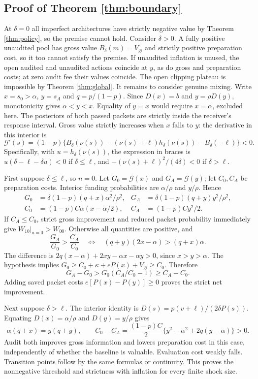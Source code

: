 \documentclass[11pt]{article}
\begin{document}
\subsection{Proof of Theorem \ref{thm:boundary}}\label{app:boundary}
At $\delta=0$ all imperfect architectures have strictly negative value by Theorem \ref{thm:policy}, so the premise cannot hold. Consider $\delta>0$. A fully positive unaudited pool has gross value $B_\delta(m)=V_\varnothing$ and strictly positive preparation cost, so it too cannot satisfy the premise. If unaudited inflation is unused, the open audited and unaudited actions coincide at $y$, as do gross and preparation costs; at zero audit fee their values coincide. The open clipping plateau is impossible by Theorem \ref{thm:global}. It remains to consider genuine mixing. Write $x=s_0>\alpha$, $y=s_A$ and $q=p/(1-p)$. Since $D(x)=b$ and $y=\rho D(y)$, monotonicity gives $\alpha<y<x$. Equality of $y=x$ would require $x=\alpha$, excluded here. The posteriors of both passed packets are strictly inside the receiver's response interval. Gross value strictly increases when $x$ falls to $y$: the derivative in this interior is
\[
\mathcal G'(s)=(1-p)\{B_\delta(\nu(s))-(\nu(s)+\ell)h_\delta(\nu(s))-B_\delta(-\ell)\}<0.
\]
Specifically, with $u=h_\delta(\nu(s))$, the expression in braces is $u(\delta-\ell-\delta u)<0$ if $\delta\leq\ell$, and $-(\nu(s)+\ell)^2/(4\delta)<0$ if $\delta>\ell$.

First suppose $\delta\leq\ell$, so $n=0$. Let $G_0=\mathcal G(x)$ and $G_A=\mathcal G(y)$; let $C_0,C_A$ be preparation costs. Interior funding probabilities are $\alpha/\rho$ and $y/\rho$. Hence
\begin{align*}
G_0&=\delta(1-p)(q+x)\alpha^2/\rho^2,&
G_A&=\delta(1-p)(q+y)y^2/\rho^2,\\
C_0&=(1-p)C\alpha(x-\alpha/2),&
C_A&=(1-p)Cy^2/2.
\end{align*}
If $C_A\leq C_0$, strict gross improvement and reduced packet probability immediately give $W_{10}|_{a=0}>W_{00}$. Otherwise all quantities are positive, and
\[
\frac{G_A}{G_0}>\frac{C_A}{C_0}
\quad\Longleftrightarrow\quad
(q+y)(2x-\alpha)>(q+x)\alpha.
\]
The difference is $2q(x-\alpha)+2xy-\alpha x-\alpha y>0$, since $x>y>\alpha$. The hypothesis implies $G_0\geq C_0+\kappa+eP(x)+V_\varnothing\geq C_0$. Therefore
\[
G_A-G_0>G_0(C_A/C_0-1)\geq C_A-C_0.
\]
Adding saved packet costs $e[P(x)-P(y)]\geq0$ proves the strict net improvement.

Next suppose $\delta>\ell$. The interior identity is $D(s)=p(v+\ell)/(2\delta P(s))$. Equating $D(x)=\alpha/\rho$ and $D(y)=y/\rho$ gives
\[
\alpha(q+x)=y(q+y),\qquad
C_0-C_A=\frac{(1-p)C}{2}\{y^2-\alpha^2+2q(y-\alpha)\}>0.
\]
Audit both improves gross information and lowers preparation cost in this case, independently of whether the baseline is valuable. Evaluation cost weakly falls. Transition points follow by the same formulas or continuity. This proves the nonnegative threshold and strictness with inflation for every finite shock size.
\end{document}
